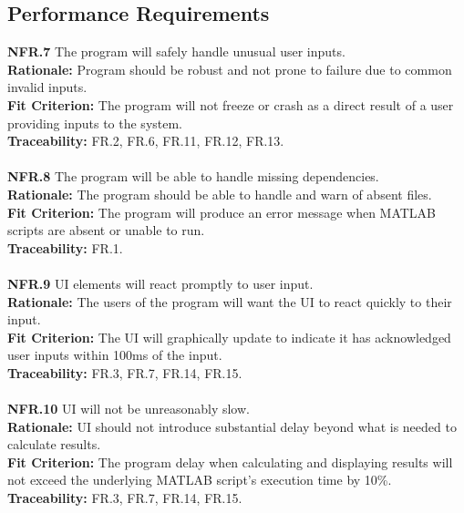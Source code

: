 \documentclass[12pt]{article}
\begin{document}
\subsection{Performance Requirements}

  \textbf{NFR.7} The program will safely handle unusual user inputs.\\
  \textbf{Rationale:} Program should be robust and not prone to failure due to common invalid inputs.\\
  \textbf{Fit Criterion:} The program will not freeze or crash as a direct result of a user providing inputs to the system.\\
  \textbf{Traceability:} FR.2, FR.6, FR.11, FR.12, FR.13.\\\\

  \noindent\textbf{NFR.8} The program will be able to handle missing dependencies.\\
  \textbf{Rationale:} The program should be able to handle and warn of absent files.\\
  \textbf{Fit Criterion:} The program will produce an error message when MATLAB scripts are absent or unable to run.\\
  \textbf{Traceability:} FR.1.\\\\

  \noindent\textbf{NFR.9} UI elements will react promptly to user input.\\
  \textbf{Rationale:} The users of the program will want the UI to react quickly to their input.\\
  \textbf{Fit Criterion:} The UI will graphically update to indicate it has acknowledged user inputs within 100ms of the input.\\
  \textbf{Traceability:} FR.3, FR.7, FR.14, FR.15.\\\\

  \noindent\textbf{NFR.10} UI will not be unreasonably slow.\\
  \textbf{Rationale:} UI should not introduce substantial delay beyond what is needed to calculate results.\\
  \textbf{Fit Criterion:} The program delay when calculating and displaying results will not exceed the underlying MATLAB script's execution time by 10\%.\\
  \textbf{Traceability:} FR.3, FR.7, FR.14, FR.15.\\\\
\end{document}
